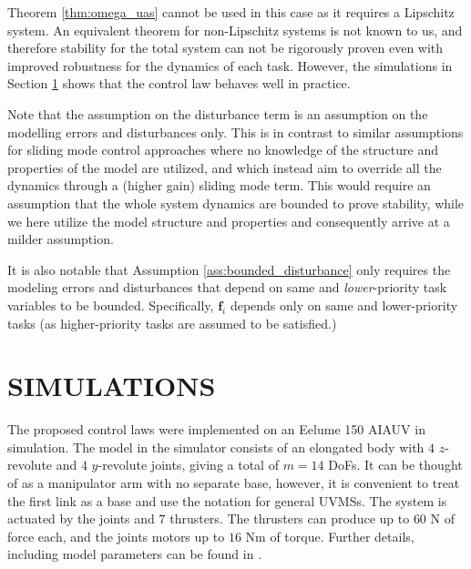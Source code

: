 \documentclass[../main.tex]{subfiles}
\begin{document}
\begin{remark}
    Theorem \ref{thm:omega_uas} cannot be used in this case as it requires a Lipschitz system. An equivalent theorem for non-Lipschitz systems is not known to us, and therefore stability for the total system can not be rigorously proven even with improved robustness for the dynamics of each task.  However, the simulations in Section \ref{sec:simulation} shows that the control law behaves well in practice.
\end{remark}
\begin{remark}
    Note that the assumption on the disturbance term is an assumption on the modelling errors and disturbances only. This is in contrast to similar assumptions for sliding mode control approaches where no knowledge of the structure and properties of the model are utilized, and which instead aim to override all the dynamics through a (higher gain) sliding mode term. This would require an assumption that the whole system dynamics are bounded to prove stability, while we here utilize the model structure and properties and consequently arrive at a milder assumption.
\end{remark}

\begin{remark}
    It is also notable that Assumption \ref{ass:bounded_disturbance} only requires the modeling errors and disturbances that depend on same and {\em lower}-priority task variables to be bounded. Specifically, $\bm{f}_i$ depends only on same and lower-priority tasks (as higher-priority tasks are assumed to be satisfied.)
\end{remark}

\section{SIMULATIONS}
\label{sec:simulation}

The proposed control laws were implemented on an Eelume 150 AIAUV in simulation. The model in the simulator consists of an elongated body with $4$ $z$-revolute and $4$ $y$-revolute joints, giving a total of $m = 14$ DoFs. It can be thought of as a manipulator arm with no separate base, however, it is convenient to treat the first link as a base and use the notation for general UVMSs. The system is actuated by the joints and $7$ thrusters. The thrusters can produce up to $60$ N of force each, and the joints motors up to $16$ Nm of torque. Further details, including model parameters can be found in \cite{Schmidt2018,Borlaug2020a}.
\end{document}
